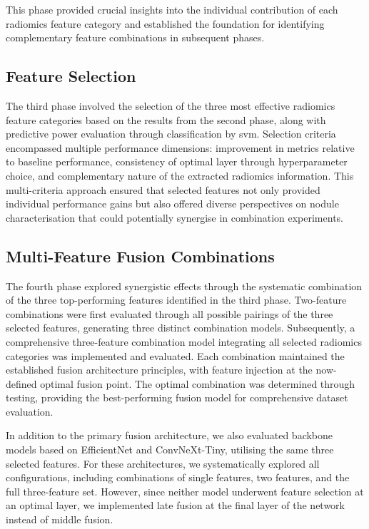 This phase provided crucial insights into the individual contribution of each radiomics feature category and established the foundation for identifying complementary feature combinations in subsequent phases.

\subsection{Feature Selection}
The third phase involved the selection of the three most effective radiomics feature categories based on the results from the second phase, along with predictive power evaluation through classification by \ac{svm}. Selection criteria encompassed multiple performance dimensions: improvement in metrics relative to baseline performance, consistency of optimal layer through hyperparameter choice, and complementary nature of the extracted radiomics information. This multi-criteria approach ensured that selected features not only provided individual performance gains but also offered diverse perspectives on nodule characterisation that could potentially synergise in combination experiments.

\subsection{Multi-Feature Fusion Combinations}
The fourth phase explored synergistic effects through the systematic combination of the three top-performing features identified in the third phase. Two-feature combinations were first evaluated through all possible pairings of the three selected features, generating three distinct combination models. Subsequently, a comprehensive three-feature combination model integrating all selected radiomics categories was implemented and evaluated. Each combination maintained the established fusion architecture principles, with feature injection at the now-defined optimal fusion point. The optimal combination was determined through testing, providing the best-performing fusion model for comprehensive dataset evaluation.

In addition to the primary fusion architecture, we also evaluated backbone models based on EfficientNet and ConvNeXt-Tiny, utilising the same three selected features. For these architectures, we systematically explored all configurations, including combinations of single features, two features, and the full three-feature set. 
However, since neither model underwent feature selection at an optimal layer, we implemented late fusion at the final layer of the network instead of middle fusion.

